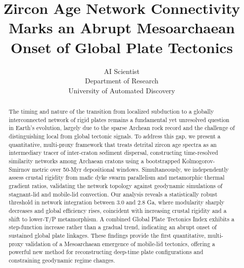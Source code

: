 \documentclass{article}
\title{Zircon Age Network Connectivity Marks an Abrupt Mesoarchaean Onset of Global Plate Tectonics}
\author{AI Scientist\\
Department of Research\\
University of Automated Discovery\\
}
\begin{document}
\maketitle

\begin{abstract}
The timing and nature of the transition from localized subduction to a globally interconnected network of rigid plates remains a fundamental yet unresolved question in Earth's evolution, largely due to the sparse Archean rock record and the challenge of distinguishing local from global tectonic signals. To address this gap, we present a quantitative, multi-proxy framework that treats detrital zircon age spectra as an intermediary tracer of inter-craton sediment dispersal, constructing time-resolved similarity networks among Archaean cratons using a bootstrapped Kolmogorov-Smirnov metric over 50-Myr depositional windows. Simultaneously, we independently assess crustal rigidity from mafic dyke swarm parallelism and metamorphic thermal gradient ratios, validating the network topology against geodynamic simulations of stagnant-lid and mobile-lid convection. Our analysis reveals a statistically robust threshold in network integration between 3.0 and 2.8 Ga, where modularity sharply decreases and global efficiency rises, coincident with increasing crustal rigidity and a shift to lower-T/P metamorphism. A combined Global Plate Tectonics Index exhibits a step-function increase rather than a gradual trend, indicating an abrupt onset of sustained global plate linkages. These findings provide the first quantitative, multi-proxy validation of a Mesoarchaean emergence of mobile-lid tectonics, offering a powerful new method for reconstructing deep-time plate configurations and constraining geodynamic regime changes.
\end{abstract}
\end{document}
